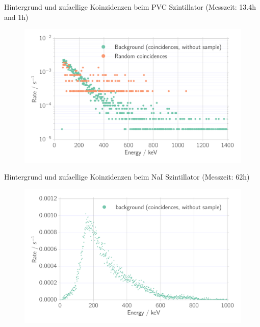 \documentclass[xcolor=x11names,compress]{beamer}
\renewcommand{\(}{\begin{columns}}
\renewcommand{\)}{\end{columns}}
\newcommand{\<}[1]{\begin{column}{#1}}
\renewcommand{\>}{\end{column}}
\begin{document}
\begin{frame}[t]{Hintergrund und zufaellige Koinzidenzen beim 
        PVC Szintillator (Messzeit: 13.4h and 1h)}
    \begin{figure}[htpb]
    \centering
    \includegraphics[width=1.0\linewidth]{../analysis/figures/coin_background_random}
    \label{fig:coin_ps_background}
\end{figure}
\end{frame}

\begin{frame}[t]{Hintergrund und zufaellige Koinzidenzen beim 
        NaI Szintillator (Messzeit: 62h)}
\begin{figure}[htpb]
    \centering
    \includegraphics[width=1.0\linewidth]{../analysis/figures/coin_na_background}
\end{figure}
\end{frame}
\end{document}
